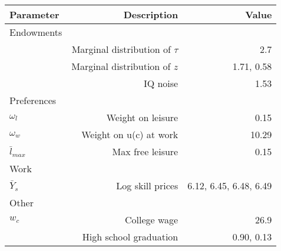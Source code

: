 \begin{tabular}{lrr}
\hline
Parameter & Description  & Value  \\ 
\hline
Endowments &   &   \\ 
 & Marginal distribution of $\tau$  & 2.7  \\ 
 & Marginal distribution of $z$  & 1.71, 0.58  \\ 
 & IQ noise  & 1.53  \\ 
Preferences &   &   \\ 
$\omega_{l}$ & Weight on leisure  & 0.15  \\ 
$\omega_{w}$ & Weight on u(c) at work  & 10.29  \\ 
$\bar{l}_{max}$ & Max free leisure  & 0.15  \\ 
Work &   &   \\ 
$\bar{Y}_{s}$ & Log skill prices  & 6.12, 6.45, 6.48, 6.49  \\ 
Other &   &   \\ 
$w_{c}$ & College wage  & 26.9  \\ 
 & High school graduation  & 0.90, 0.13  \\ 
\hline
\end{tabular}%
